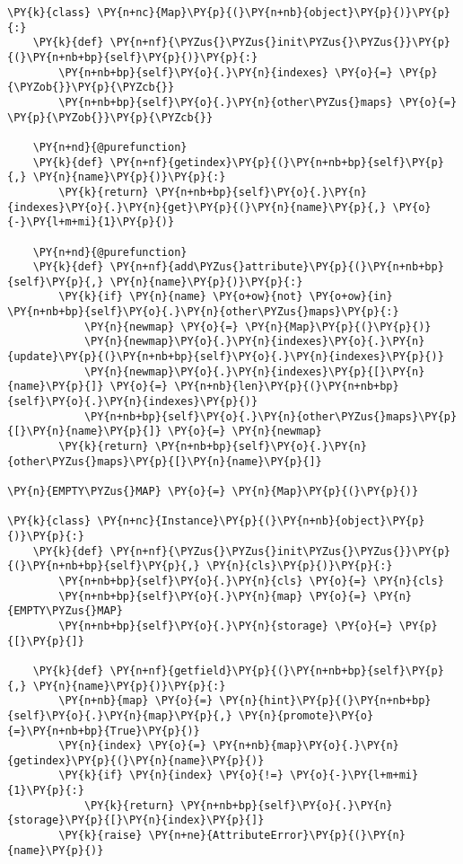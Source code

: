 \begin{Verbatim}[commandchars=\\\{\}]
\PY{k}{class} \PY{n+nc}{Map}\PY{p}{(}\PY{n+nb}{object}\PY{p}{)}\PY{p}{:}
    \PY{k}{def} \PY{n+nf}{\PYZus{}\PYZus{}init\PYZus{}\PYZus{}}\PY{p}{(}\PY{n+nb+bp}{self}\PY{p}{)}\PY{p}{:}
        \PY{n+nb+bp}{self}\PY{o}{.}\PY{n}{indexes} \PY{o}{=} \PY{p}{\PYZob{}}\PY{p}{\PYZcb{}}
        \PY{n+nb+bp}{self}\PY{o}{.}\PY{n}{other\PYZus{}maps} \PY{o}{=} \PY{p}{\PYZob{}}\PY{p}{\PYZcb{}}

    \PY{n+nd}{@purefunction}
    \PY{k}{def} \PY{n+nf}{getindex}\PY{p}{(}\PY{n+nb+bp}{self}\PY{p}{,} \PY{n}{name}\PY{p}{)}\PY{p}{:}
        \PY{k}{return} \PY{n+nb+bp}{self}\PY{o}{.}\PY{n}{indexes}\PY{o}{.}\PY{n}{get}\PY{p}{(}\PY{n}{name}\PY{p}{,} \PY{o}{-}\PY{l+m+mi}{1}\PY{p}{)}

    \PY{n+nd}{@purefunction}
    \PY{k}{def} \PY{n+nf}{add\PYZus{}attribute}\PY{p}{(}\PY{n+nb+bp}{self}\PY{p}{,} \PY{n}{name}\PY{p}{)}\PY{p}{:}
        \PY{k}{if} \PY{n}{name} \PY{o+ow}{not} \PY{o+ow}{in} \PY{n+nb+bp}{self}\PY{o}{.}\PY{n}{other\PYZus{}maps}\PY{p}{:}
            \PY{n}{newmap} \PY{o}{=} \PY{n}{Map}\PY{p}{(}\PY{p}{)}
            \PY{n}{newmap}\PY{o}{.}\PY{n}{indexes}\PY{o}{.}\PY{n}{update}\PY{p}{(}\PY{n+nb+bp}{self}\PY{o}{.}\PY{n}{indexes}\PY{p}{)}
            \PY{n}{newmap}\PY{o}{.}\PY{n}{indexes}\PY{p}{[}\PY{n}{name}\PY{p}{]} \PY{o}{=} \PY{n+nb}{len}\PY{p}{(}\PY{n+nb+bp}{self}\PY{o}{.}\PY{n}{indexes}\PY{p}{)}
            \PY{n+nb+bp}{self}\PY{o}{.}\PY{n}{other\PYZus{}maps}\PY{p}{[}\PY{n}{name}\PY{p}{]} \PY{o}{=} \PY{n}{newmap}
        \PY{k}{return} \PY{n+nb+bp}{self}\PY{o}{.}\PY{n}{other\PYZus{}maps}\PY{p}{[}\PY{n}{name}\PY{p}{]}

\PY{n}{EMPTY\PYZus{}MAP} \PY{o}{=} \PY{n}{Map}\PY{p}{(}\PY{p}{)}

\PY{k}{class} \PY{n+nc}{Instance}\PY{p}{(}\PY{n+nb}{object}\PY{p}{)}\PY{p}{:}
    \PY{k}{def} \PY{n+nf}{\PYZus{}\PYZus{}init\PYZus{}\PYZus{}}\PY{p}{(}\PY{n+nb+bp}{self}\PY{p}{,} \PY{n}{cls}\PY{p}{)}\PY{p}{:}
        \PY{n+nb+bp}{self}\PY{o}{.}\PY{n}{cls} \PY{o}{=} \PY{n}{cls}
        \PY{n+nb+bp}{self}\PY{o}{.}\PY{n}{map} \PY{o}{=} \PY{n}{EMPTY\PYZus{}MAP}
        \PY{n+nb+bp}{self}\PY{o}{.}\PY{n}{storage} \PY{o}{=} \PY{p}{[}\PY{p}{]}

    \PY{k}{def} \PY{n+nf}{getfield}\PY{p}{(}\PY{n+nb+bp}{self}\PY{p}{,} \PY{n}{name}\PY{p}{)}\PY{p}{:}
        \PY{n+nb}{map} \PY{o}{=} \PY{n}{hint}\PY{p}{(}\PY{n+nb+bp}{self}\PY{o}{.}\PY{n}{map}\PY{p}{,} \PY{n}{promote}\PY{o}{=}\PY{n+nb+bp}{True}\PY{p}{)}
        \PY{n}{index} \PY{o}{=} \PY{n+nb}{map}\PY{o}{.}\PY{n}{getindex}\PY{p}{(}\PY{n}{name}\PY{p}{)}
        \PY{k}{if} \PY{n}{index} \PY{o}{!=} \PY{o}{-}\PY{l+m+mi}{1}\PY{p}{:}
            \PY{k}{return} \PY{n+nb+bp}{self}\PY{o}{.}\PY{n}{storage}\PY{p}{[}\PY{n}{index}\PY{p}{]}
        \PY{k}{raise} \PY{n+ne}{AttributeError}\PY{p}{(}\PY{n}{name}\PY{p}{)}


\end{Verbatim}
